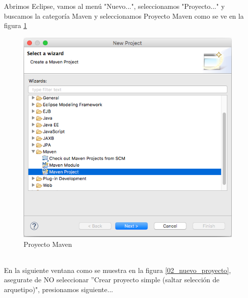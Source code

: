 \documentclass[12pt]{article}
\begin{document}
		Abrimos Eclipse, vamos al men\'u "Nuevo...", seleccionamos "Proyecto..." y buscamos la categor\'ia Maven y seleccionamos Proyecto Maven como se ve en la figura \ref{01_nuevo_proyecto}
        \begin{figure}[h]
            \centering
            \includegraphics[scale=0.4]{01_nuevo_proyecto}
            \caption{Proyecto Maven}
            \label{01_nuevo_proyecto}
        \end{figure}
		\\
		En la siguiente ventana como se muestra en la figura \ref{02_nuevo_proyecto}, asegurate de NO seleccionar ''Crear proyecto simple (saltar selecci\'on de arquetipo)", presionamos siguiente...
\end{document}
